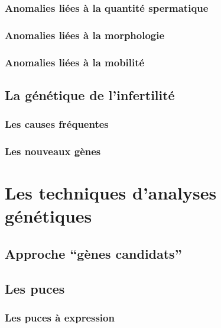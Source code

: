 \documentclass[12pt,a4paper,twoside]{ugathesis}
\begin{document}
\subsubsection{Anomalies liées à la quantité
spermatique}\label{infquant}

\subsubsection{Anomalies liées à la
morphologie}\label{anomalies-liees-a-la-morphologie}

\subsubsection{Anomalies liées à la
mobilité}\label{anomalies-liees-a-la-mobilite}

\subsection{La génétique de
l'infertilité}\label{la-genetique-de-linfertilite}

\subsubsection{Les causes fréquentes}\label{les-causes-frequentes}

\subsubsection{Les nouveaux gènes}\label{les-nouveaux-genes}

\section{Les techniques d'analyses
génétiques}\label{les-techniques-danalyses-genetiques}

\subsection{\texorpdfstring{Approche ``gènes
candidats''}{Approche gènes candidats}}\label{approche-genes-candidats}

\subsection{Les puces}\label{les-puces}

\subsubsection{Les puces à expression}\label{les-puces-a-expression}
\end{document}

